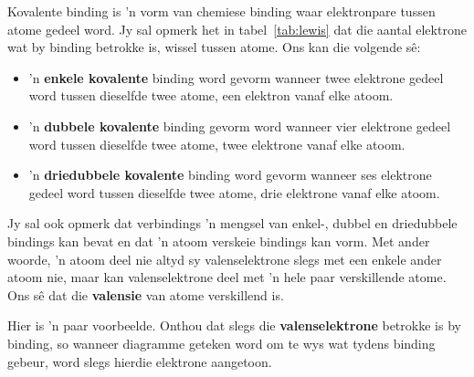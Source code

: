 
\label{m38704*fhsst!!!underscore!!!id94}
 {Kovalente binding is 'n vorm van chemiese binding waar elektronpare tussen atome gedeel word.} 
\label{m38704*id139505}Jy sal opmerk het in tabel~\ref{tab:lewis} dat die aantal elektrone wat by binding betrokke is, wissel tussen atome. Ons kan die volgende s\^{e}:
\begin{itemize}
 \item 'n \textbf{enkele kovalente} binding word gevorm wanneer twee elektrone gedeel word tussen dieselfde twee atome, een elektron vanaf elke atoom. 
 \item 'n \textbf{dubbele kovalente} binding gevorm word wanneer vier elektrone gedeel word tussen dieselfde twee atome, twee elektrone vanaf elke atoom.
 \item 'n \textbf{driedubbele kovalente} binding word gevorm wanneer ses elektrone gedeel word tussen dieselfde twee atome, drie elektrone vanaf elke atoom.
\end{itemize}
Jy sal ook opmerk dat verbindings 'n mengsel van enkel-, dubbel en driedubbele bindings kan bevat en dat 'n atoom verskeie bindings kan vorm. Met ander woorde, 'n atoom deel nie altyd sy valenselektrone slegs met een enkele ander atoom nie, maar kan valenselektrone deel met  'n hele paar verskillende atome.\\
Ons s\^{e} dat die \textbf{valensie} van atome verskillend is. 


\label{m38704*id138991}Hier is 'n paar voorbeelde. Onthou dat slegs die \textbf{valenselektrone} betrokke is by binding, so wanneer diagramme geteken word om te wys wat tydens binding gebeur, word slegs hierdie elektrone aangetoon. \par 
\label{m38704*secfhsst!!!underscore!!!id98} 


